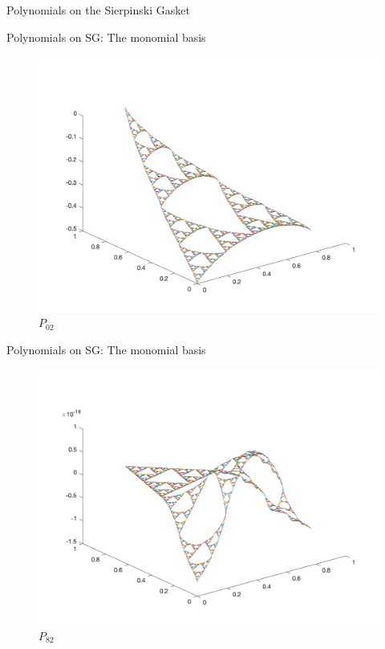 \documentclass[xcolor = dvipsnames]{beamer}
\begin{document}
\begin{section}{Polynomials on the Sierpinski Gasket}
\begin{frame}{Polynomials on SG: The monomial basis}
    \begin{figure}[H]
        \centering
        
        \includegraphics[width=0.75\linewidth]{Final_presentation/monomial0_2.png}
        \caption{$P_{02}$}
        
    \end{figure}
    
\end{frame}

\begin{frame}{Polynomials on SG: The monomial basis}

    \begin{figure}[H]
        \centering
        
        \includegraphics[width=0.75\linewidth]{Final_presentation/monomial8_2.png}
        \caption{$P_{82}$}
        
    \end{figure}
    
\end{frame}


\end{section}
\end{document}

